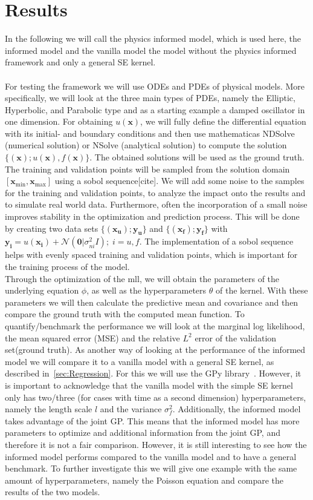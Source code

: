 \documentclass{article}
\begin{document}
\section{Results}
In the following we will call the physics informed model, which is used here, the
informed model and the vanilla model the model without the physics informed
framework and only a general SE kernel.\\ \\ For testing the framework we will
use ODEs and PDEs of physical models. More specifically, we will look at the
three main types of PDEs, namely the Elliptic, Hyperbolic, and Parabolic type and as a starting example a damped oscillator in one dimension. For obtaining
$u(\bm{x})$, we will fully define the differential equation with its initial-
and boundary conditions and then use mathematicas NDSolve (numerical solution)
or NSolve (analytical solution) to compute the solution
$\{(\bm{x});u(\bm{x}),f(\bm{x})\}$. The obtained solutions will be used as the ground truth.
The training and validation points will be sampled from the solution domain $[\bm{x}_{\min}, \bm{x}_{\max}]$ using a sobol
sequence[cite]. We will add some noise to the samples for the training and
validation points, to analyze the impact onto the results and to simulate real
world data. Furthermore, often the incorporation of a small noise improves stability in
the optimization and prediction process. This will be done by creating two data
sets $\{(\bm{x_u});\bm{y_u}\}$ and $\{(\bm{x_f});\bm{y_f}\}$ with $\bm{y_i} =
    u(\bm{x_i}) + \mathcal{N}(\bm{0}|\sigma_{ni}^2 I) ; \; i = u,f$. The
implementation of a sobol sequence helps with evenly spaced training and
validation points, which is important for the training process of the model.\\
Through the optimization of the mll, we will obtain the parameters of the
underlying equation $\phi$, as well as the hyperparameters $\theta$ of the
kernel. With these parameters we will then calculate the predictive mean and
covariance and then compare the ground truth with the computed mean function.
To quantify/benchmark the performance we will look at the marginal log likelihood, the mean squared error (MSE) and the relative $L^2$ error of the validation set(ground truth). As another
way of looking at the performance of the informed model we will compare it to a
vanilla model with a general SE kernel, as described in~\ref{sec:Regression}.
For this we will use the GPy library~\cite{gpy2014}. However, it is important
to acknowledge that the vanilla model with the simple SE kernel only has two/three (for cases with time as a second dimension) hyperparameters, namely the length scale $l$ and the variance $\sigma_f^2$.
Additionally, the informed model takes advantage of the joint GP. This means
that the informed model has more parameters to optimize and additional
information from the joint GP, and therefore it is not a fair comparison.
However, it is still interesting to see how the informed model performs
compared to the vanilla model and to have a general benchmark. To further
investigate this we will give one example with the same amount of
hyperparameters, namely the Poisson equation and compare the results of the two
models.\\
\end{document}
